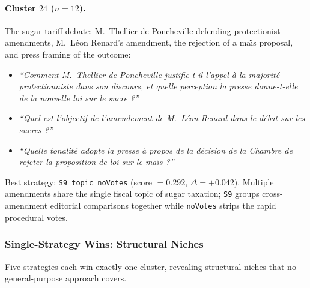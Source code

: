 \paragraph{Cluster $24$ ($n=12$).}
The sugar tariff debate: M.~Thellier de Poncheville defending protectionist
amendments, M.~L\'{e}on Renard's amendment, the rejection of a ma\"{\i}s
proposal, and press framing of the outcome:
\begin{itemize}
  \item \textit{``Comment M.~Thellier de Poncheville justifie-t-il l'appel
    \`{a} la majorit\'{e} protectionniste dans son discours, et quelle perception
    la presse donne-t-elle de la nouvelle loi sur le sucre ?''}
  \item \textit{``Quel est l'objectif de l'amendement de M.~L\'{e}on Renard dans
    le d\'{e}bat sur les sucres ?''}
  \item \textit{``Quelle tonalit\'{e} adopte la presse \`{a} propos de la
    d\'{e}cision de la Chambre de rejeter la proposition de loi sur le ma\"{\i}s
    ?''}
\end{itemize}
Best strategy: \texttt{S9\_topic\_noVotes} (score $= 0.292$, $\Delta = +0.042$).
Multiple amendments share the single fiscal topic of sugar taxation; \texttt{S9}
groups cross-amendment editorial comparisons together while \texttt{noVotes}
strips the rapid procedural votes.

\subsubsection{Single-Strategy Wins: Structural Niches}
\label{sec:single-winners}

Five strategies each win exactly one cluster, revealing structural niches that no
general-purpose approach covers.

